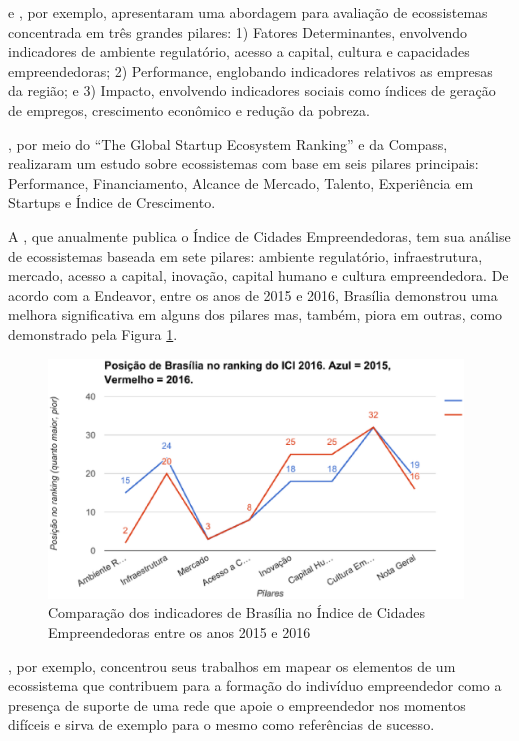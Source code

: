  e , por exemplo, apresentaram uma abordagem para avaliação de ecossistemas concentrada em três grandes pilares: 1) Fatores Determinantes, envolvendo indicadores de ambiente regulatório, acesso a capital, cultura e capacidades empreendedoras; 2) Performance, englobando indicadores relativos as empresas da região; e 3) Impacto, envolvendo indicadores sociais como índices de geração de empregos, crescimento econômico e redução da pobreza. 

, por meio do ``The Global Startup Ecosystem Ranking'' e da Compass, realizaram um estudo sobre ecossistemas com base em seis pilares principais: Performance, Financiamento, Alcance de Mercado, Talento, Experiência em Startups e Índice de Crescimento. 

A , que anualmente publica o Índice de Cidades Empreendedoras, tem sua análise de ecossistemas baseada em sete pilares: ambiente regulatório, infraestrutura, mercado, acesso a capital, inovação, capital humano e cultura empreendedora. De acordo com a Endeavor, entre os anos de 2015 e 2016, Brasília demonstrou uma melhora significativa em alguns dos pilares mas, também, piora em outras, como demonstrado pela Figura \ref{figure:ici20152016}.

\begin{figure}[!htb]
	\centering
	\includegraphics[width=11cm,angle=0]{figuras/ici20152016}
	\caption{Comparação dos indicadores de Brasília no Índice de Cidades Empreendedoras entre os anos 2015 e 2016}
	\label{figure:ici20152016}
\end{figure}

, por exemplo, concentrou seus trabalhos em mapear os elementos de um ecossistema que contribuem para a formação do indivíduo empreendedor como a presença de suporte de uma rede que apoie o empreendedor nos momentos difíceis e sirva de exemplo para o mesmo como referências de sucesso. 

